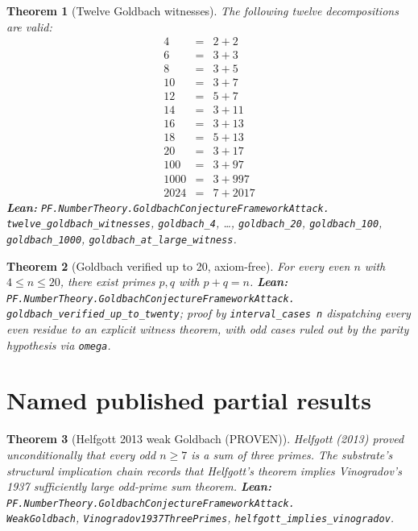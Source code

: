 \documentclass[11pt,a4paper]{article}
\theoremstyle{plain}
\newtheorem{theorem}{Theorem}[section]
\theoremstyle{definition}
\begin{document}
\begin{theorem}[Twelve Goldbach witnesses]
\label{thm:twelve-witnesses}
The following twelve decompositions are valid:
\[
\begin{array}{rcl}
4   &=& 2 + 2 \\
6   &=& 3 + 3 \\
8   &=& 3 + 5 \\
10  &=& 3 + 7 \\
12  &=& 5 + 7 \\
14  &=& 3 + 11 \\
16  &=& 3 + 13 \\
18  &=& 5 + 13 \\
20  &=& 3 + 17 \\
100  &=& 3 + 97 \\
1000 &=& 3 + 997 \\
2024 &=& 7 + 2017
\end{array}
\]
\textbf{Lean:}
\texttt{PF.NumberTheory.GoldbachConjectureFrameworkAttack.\\
twelve\_goldbach\_witnesses},
\texttt{goldbach\_4}, \ldots, \texttt{goldbach\_20},
\texttt{goldbach\_100}, \texttt{goldbach\_1000},
\texttt{goldbach\_at\_large\_witness}.
\end{theorem}

\begin{theorem}[Goldbach verified up to 20, axiom-free]
\label{thm:verified-20}
For every even $n$ with $4 \le n \le 20$, there exist primes $p, q$
with $p + q = n$.
\textbf{Lean:}
\texttt{PF.NumberTheory.GoldbachConjectureFrameworkAttack.\\
goldbach\_verified\_up\_to\_twenty};
proof by \texttt{interval\_cases n} dispatching every even residue to
an explicit witness theorem, with odd cases ruled out by the parity
hypothesis via \texttt{omega}.
\end{theorem}

\section{Named published partial results}
\label{sec:partials}

\begin{theorem}[Helfgott 2013 weak Goldbach (PROVEN)]
\label{thm:helfgott}
Helfgott (2013) proved unconditionally that every odd $n \ge 7$ is a
sum of three primes. The substrate's structural implication chain
records that Helfgott's theorem implies Vinogradov's 1937 sufficiently
large odd-prime sum theorem.
\textbf{Lean:}
\texttt{PF.NumberTheory.GoldbachConjectureFrameworkAttack.\\
WeakGoldbach},
\texttt{Vinogradov1937ThreePrimes},
\texttt{helfgott\_implies\_vinogradov}.
\end{theorem}
\end{document}
